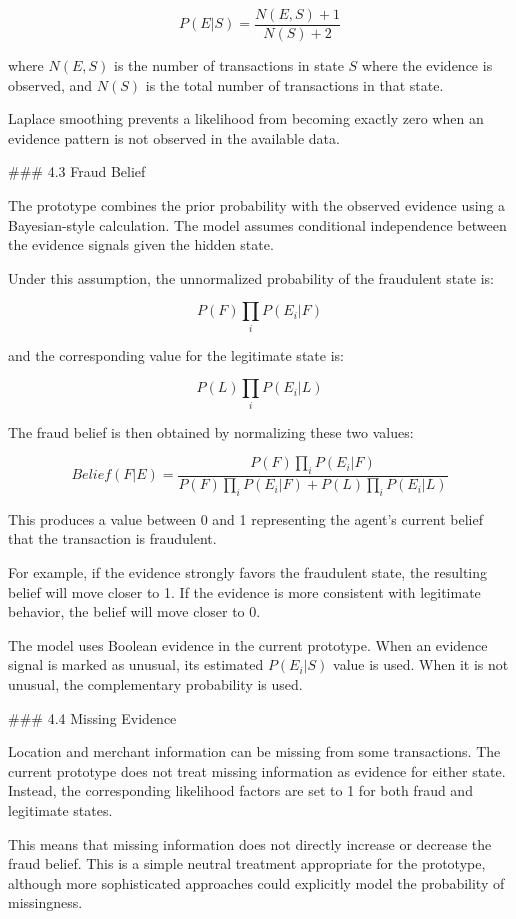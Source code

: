 $$
P(E|S)=\frac{N(E,S)+1}{N(S)+2}
$$

where \(N(E,S)\) is the number of transactions in state \(S\) where the evidence is observed, and \(N(S)\) is the total number of transactions in that state.

Laplace smoothing prevents a likelihood from becoming exactly zero when an evidence pattern is not observed in the available data.

### 4.3 Fraud Belief

The prototype combines the prior probability with the observed evidence using a Bayesian-style calculation. The model assumes conditional independence between the evidence signals given the hidden state.

Under this assumption, the unnormalized probability of the fraudulent state is:

$$
P(F)\prod_i P(E_i|F)
$$

and the corresponding value for the legitimate state is:

$$
P(L)\prod_i P(E_i|L)
$$

The fraud belief is then obtained by normalizing these two values:

$$
Belief(F|E)=
\frac{
P(F)\prod_iP(E_i|F)
}{
P(F)\prod_iP(E_i|F)
+
P(L)\prod_iP(E_i|L)
}
$$

This produces a value between 0 and 1 representing the agent's current belief that the transaction is fraudulent.

For example, if the evidence strongly favors the fraudulent state, the resulting belief will move closer to 1. If the evidence is more consistent with legitimate behavior, the belief will move closer to 0.

The model uses Boolean evidence in the current prototype. When an evidence signal is marked as unusual, its estimated \(P(E_i|S)\) value is used. When it is not unusual, the complementary probability is used.

### 4.4 Missing Evidence

Location and merchant information can be missing from some transactions. The current prototype does not treat missing information as evidence for either state. Instead, the corresponding likelihood factors are set to 1 for both fraud and legitimate states.

This means that missing information does not directly increase or decrease the fraud belief. This is a simple neutral treatment appropriate for the prototype, although more sophisticated approaches could explicitly model the probability of missingness.

